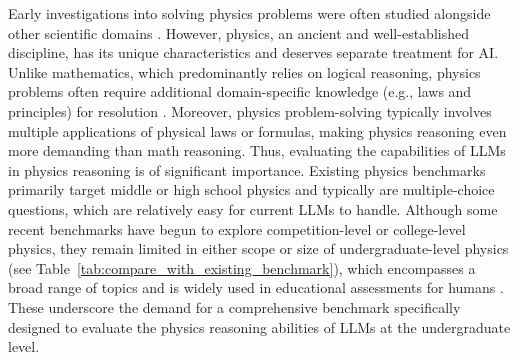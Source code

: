Early investigations into solving physics problems were often studied alongside other scientific domains \citep{minerva202lewkowycz, scienceqa2022Lu, SciBench2023Wang}. 
However, physics, an ancient and well-established discipline, has its unique characteristics and deserves separate treatment for AI. %
Unlike mathematics, which predominantly relies on logical reasoning, physics problems often require additional domain-specific knowledge (e.g., laws and principles) for resolution \citep{phyre2019bakhtin, physicsreasoner2024pang}. 
Moreover, physics problem-solving typically involves multiple applications of physical laws or formulas, making physics reasoning even more demanding than math reasoning.
Thus, evaluating the capabilities of LLMs in physics reasoning is of significant importance.
Existing physics benchmarks \citep{agieval2023zhong, GaokaoBench2023zhang, JEEBench2023Arora, sciagent2024ma, PhysQA2023Ding, PhysicsQA2024jaiswal} primarily target middle or high school physics and typically are multiple-choice questions, which are relatively easy for current LLMs to handle. 
Although some recent benchmarks have begun to explore competition-level \citep{OlympiadBench2024He, OlympicArena2024huang} or college-level \citep{MMLU2020hendrycks, c-eval2024huang, cmmlu2023li} physics, they remain limited in either scope or size of undergraduate-level physics (see Table~\ref{tab:compare_with_existing_benchmark}), which encompasses a broad range of topics and is widely used in educational assessments for humans \citep{phyedu11999McDermott, phyedu21992Heller, phyedu32003redish}. 
These underscore the demand for a comprehensive benchmark specifically designed to evaluate the physics reasoning abilities of LLMs at the undergraduate level.


